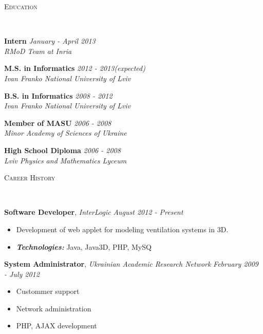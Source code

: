 \documentclass{article}
\newenvironment{changemargin}[2]{%
  \begin{list}{}{%
    \setlength{\topsep}{0pt}%
    \setlength{\leftmargin}{#1}%
    \setlength{\rightmargin}{#2}%
    \setlength{\listparindent}{\parindent}%
    \setlength{\itemindent}{\parindent}%
    \setlength{\parsep}{\parskip}%
  }%
  \item[]}{\end{list}
}
\newcommand{\lineover}{
  \begin{changemargin}{-1mm}{-1mm}
    \vspace*{-8pt}
    \hrulefill \\
    \vspace*{-2pt}
  \end{changemargin}
}
\newcommand{\header}[1]{
  \begin{changemargin}{-12mm}{-12mm}
    \scshape{#1}\\
    \lineover
  \end{changemargin}
}
\newenvironment{body}{
  \vspace*{-16pt}
  \begin{changemargin}{-6mm}{-12mm}
}{
  \end{changemargin}
}
\begin{document}



\header{Education}

\begin{body}
  \vspace{14pt}
  \textbf{Intern} \hfill \emph{January - April 2013} \\
  \emph{RMoD Team at Inria}
  \medskip
  
  \textbf{M.S. in Informatics} \hfill \emph{2012 - 2013(expected)} \\
  \emph{Ivan Franko National University of Lviv}
  \medskip
  
  \textbf{B.S. in Informatics} \hfill \emph{2008 - 2012} \\
  \emph{Ivan Franko National University of Lviv}
  \medskip
  
  \textbf{Member of MASU} \hfill \emph{2006 - 2008} \\
  \emph{Minor Academy of Sciences of Ukraine}
  \medskip
  
  \textbf{High School Diploma} \hfill \emph{2006 - 2008} \\
  \emph{Lviv Physics and Mathematics Lyceum}
\end{body}

\smallskip


\header{Career History}

\begin{body}
  \vspace{14pt}
  \textbf{Software Developer}, \emph{InterLogic} \hfill \emph{August 2012 - Present}\\
  \vspace*{-4pt}
  \begin{itemize} \itemsep -0pt
    \item Development of web applet for modeling ventilation systems in 3D.
    \item \emph{\textbf{Technologies:}}{} Java, Java3D, PHP, MySQ
  \end{itemize}
  \medskip
  
  \textbf{System Administrator}, \emph{Ukrainian Academic Research Network} \hfill \emph{February 2009 - July 2012}\\
  \vspace*{-4pt}
  \begin{itemize} \itemsep -0pt
    \item Custommer support
    \item Network administration
    \item PHP, AJAX development
  \end{itemize}

\end{body}
\end{document}
